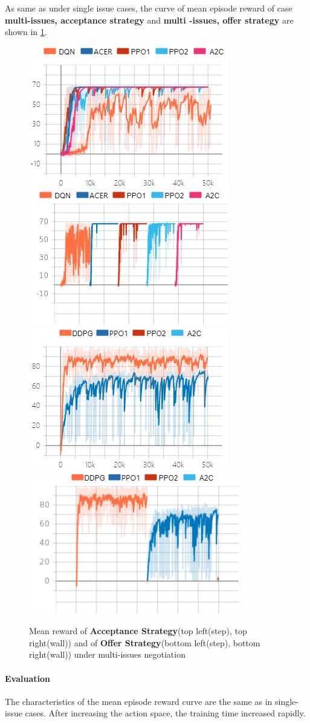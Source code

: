 As same as under single issue cases, the curve of mean episode reward of case  \textbf{multi-issues, acceptance strategy} and \textbf{multi -issues, offer strategy} are shown in \ref{fig:multi-issues}. 
\begin{figure}
    \includegraphics[width=.40\textwidth]{./images/ac_s_multi_issues.png}\hfill
    \includegraphics[width=.40\textwidth]{./images/ac_s_multi_issues_wall.png}
    \\[\smallskipamount]
    \includegraphics[width=.40\textwidth]{./images/of_s_multi_issues.png}\hfill
    \includegraphics[width=.40\textwidth]{./images/of_s_multi_issues_wall.png}
    \caption{Mean reward of \textbf{Acceptance Strategy}(top left(step), top right(wall)) and of \textbf{Offer Strategy}(bottom left(step), bottom right(wall)) under multi-issues negotiation}
		\label{fig:multi-issues}
\end{figure}

\paragraph{Evaluation} The characteristics of the mean episode reward curve are the same as in single-issue cases. After increasing the action space, the training time increased rapidly. 

